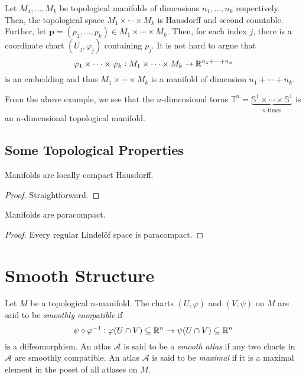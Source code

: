 \begin{example}
    Let $M_1,\ldots,M_k$ be topological manifolds of dimensions $n_1,\ldots,n_k$ respectively. Then, the topological space $M_1\times\cdots\times M_k$ is Hausdorff and second countable. Further, let $\mathbf p = (p_1,\ldots,p_k)\in M_1\times\cdots\times M_k$. Then, for each index $j$, there is a coordinate chart $(U_j,\varphi_j)$ containing $p_j$. It is not hard to argue that 
    \begin{equation*}
        \varphi_1\times\cdots\times\varphi_k: M_1\times\cdots\times M_k\to\mathbb{R}^{n_1 + \cdots + n_k}
    \end{equation*}
    is an embedding and thus $M_1\times\cdots\times M_k$ is a manifold of dimension $n_1 + \cdots + n_k$.
\end{example}

From the above example, we see that the $n$-dimensional torus $\mathbb T^n = \underbrace{\mathbb S^1\times\cdots\times\mathbb S^1}_{n\text{-times}}$ is an $n$-dimensional topological manifold.

\subsection{Some Topological Properties}

\begin{lemma}
    Manifolds are locally compact Hausdorff.
\end{lemma}
\begin{proof}
    Straightforward.
\end{proof}

\begin{lemma}
    Manifolds are paracompact.
\end{lemma}
\begin{proof}
    Every regular Lindel\"of space is paracompact.
\end{proof}

\section{Smooth Structure}

\begin{definition}
    Let $M$ be a topological $n$-manifold. The charts $(U,\varphi)$ and $(V,\psi)$ on $M$ are said to be \emph{smoothly compatible} if 
    \begin{equation*}
        \psi\circ\varphi^{-1}:\varphi(U\cap V)\subseteq\mathbb{R}^n\to\psi(U\cap V)\subseteq\mathbb{R}^n
    \end{equation*}
    is a diffeomorphism. An atlas $\mathscr A$ is said to be a \emph{smooth atlas} if any two charts in $\mathscr A$ are smoothly compatible. An atlas $\mathscr A$ is said to be \emph{maximal} if it is a maximal element in the poset of all atlases on $M$.
\end{definition}


